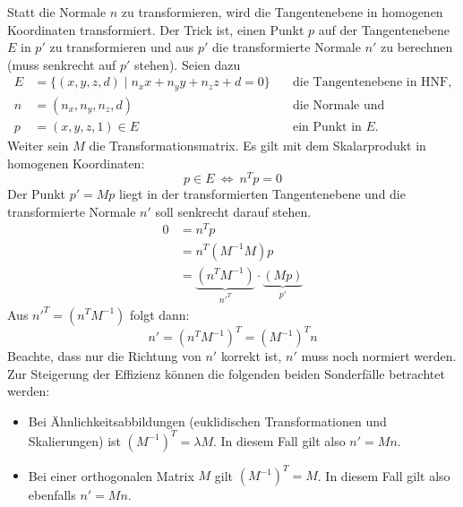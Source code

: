 Statt die Normale $n$ zu transformieren, wird die Tangentenebene in homogenen Koordinaten transformiert.
Der Trick ist, einen Punkt $p$ auf der Tangentenebene $E$ in $p'$ zu transformieren und aus $p'$ die transformierte Normale $n'$ zu berechnen (muss senkrecht auf $p'$ stehen).
Seien dazu
\begin{align*}
  E &= \{(x, y, z, d) \mid n_xx + n_yy + n_zz + d = 0\} \quad &\text{die Tangentenebene in HNF,} \\
  n &= (n_x, n_y, n_z, d) &\text{die Normale und} \\
  p &= (x, y, z, 1) \in E &\text{ein Punkt in $E$.}
\end{align*}
Weiter sein $M$ die Transformationsmatrix.
Es gilt mit dem Skalarprodukt in homogenen Koordinaten:
\[
  p \in E ~\Longleftrightarrow~ n^Tp = 0
\]
Der Punkt $p' = Mp$ liegt in der transformierten Tangentenebene und die transformierte Normale $n'$ soll senkrecht darauf stehen.
\begin{align*}
  0 &= n^Tp \\
  &= n^T(M^{-1}M)p \\
  &= \underbrace{(n^TM^{-1})}_{n'^T} \cdot \underbrace{(Mp)}_{p'}
\end{align*}
Aus $n'^T = (n^TM^{-1})$ folgt dann:
\[
  n' = (n^TM^{-1})^T = (M^{-1})^Tn
\]
Beachte, dass nur die Richtung von $n'$ korrekt ist, $n'$ muss noch normiert werden.
Zur Steigerung der Effizienz können die folgenden beiden Sonderfälle betrachtet werden:
\begin{itemize}
  \item Bei Ähnlichkeitsabbildungen (euklidischen Transformationen und Skalierungen) ist $(M^{-1})^T = \lambda M$.
  In diesem Fall gilt also $n' = Mn$.
  \item Bei einer orthogonalen Matrix $M$ gilt $(M^{-1})^T = M$.
  In diesem Fall gilt also ebenfalls $n' = Mn$.
\end{itemize}
